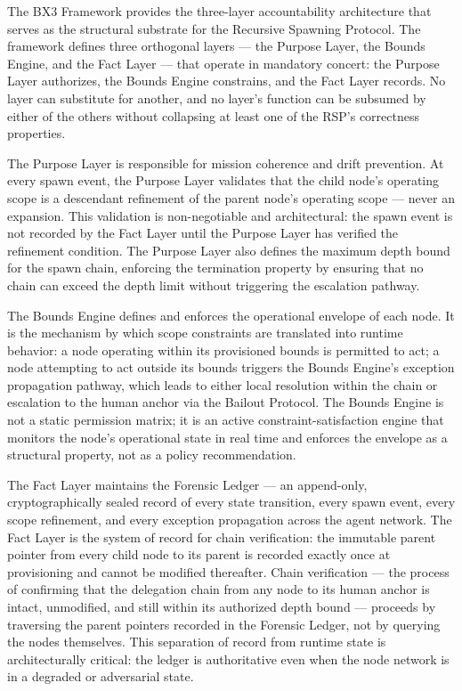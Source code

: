 The BX3 Framework provides the three-layer accountability architecture that serves as the structural substrate for the Recursive Spawning Protocol. The framework defines three orthogonal layers — the Purpose Layer, the Bounds Engine, and the Fact Layer — that operate in mandatory concert: the Purpose Layer authorizes, the Bounds Engine constrains, and the Fact Layer records. No layer can substitute for another, and no layer's function can be subsumed by either of the others without collapsing at least one of the RSP's correctness properties.\cite{bx3_recursive_spawning_integration}

The Purpose Layer is responsible for mission coherence and drift prevention. At every spawn event, the Purpose Layer validates that the child node's operating scope is a descendant refinement of the parent node's operating scope — never an expansion. This validation is non-negotiable and architectural: the spawn event is not recorded by the Fact Layer until the Purpose Layer has verified the refinement condition. The Purpose Layer also defines the maximum depth bound for the spawn chain, enforcing the termination property by ensuring that no chain can exceed the depth limit without triggering the escalation pathway.\cite{bx3_framework_scope}

The Bounds Engine defines and enforces the operational envelope of each node. It is the mechanism by which scope constraints are translated into runtime behavior: a node operating within its provisioned bounds is permitted to act; a node attempting to act outside its bounds triggers the Bounds Engine's exception propagation pathway, which leads to either local resolution within the chain or escalation to the human anchor via the Bailout Protocol. The Bounds Engine is not a static permission matrix; it is an active constraint-satisfaction engine that monitors the node's operational state in real time and enforces the envelope as a structural property, not as a policy recommendation.\cite{bx3_framework_scope}

The Fact Layer maintains the Forensic Ledger — an append-only, cryptographically sealed record of every state transition, every spawn event, every scope refinement, and every exception propagation across the agent network. The Fact Layer is the system of record for chain verification: the immutable parent pointer from every child node to its parent is recorded exactly once at provisioning and cannot be modified thereafter. Chain verification — the process of confirming that the delegation chain from any node to its human anchor is intact, unmodified, and still within its authorized depth bound — proceeds by traversing the parent pointers recorded in the Forensic Ledger, not by querying the nodes themselves. This separation of record from runtime state is architecturally critical: the ledger is authoritative even when the node network is in a degraded or adversarial state.\cite{bx3_recursive_spawning_integration}

